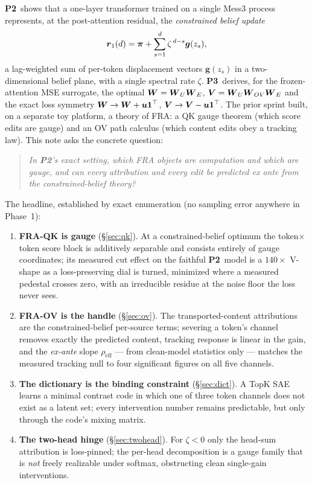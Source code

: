 \documentclass{article}
\newcommand{\gb}{\boldsymbol{g}}
\newcommand{\Ptwo}{\textbf{P2}}
\newcommand{\Pthree}{\textbf{P3}}
\begin{document}
\Ptwo\ shows that a one-layer transformer trained on a single Mess3 process
represents, at the post-attention residual, the \emph{constrained belief update}
\begin{equation}\label{eq:cbu-intro}
\rb_1(d)=\pib+\sum_{s=1}^{d}\zeta^{\,d-s}\gb(z_s),
\end{equation}
a lag-weighted sum of per-token displacement vectors $\gb(z_s)$ in a
two-dimensional belief plane, with a single spectral rate $\zeta$. \Pthree\ derives,
for the frozen-attention MSE surrogate, the optimal $\boldsymbol{W}=\boldsymbol{W}_U\boldsymbol{W}_E$,
$\boldsymbol{V}=\boldsymbol{W}_U\boldsymbol{W}_{OV}\boldsymbol{W}_E$ and the exact loss symmetry $\boldsymbol{W}\to\boldsymbol{W}+\boldsymbol{u}\boldsymbol{1}^\top$,
$\boldsymbol{V}\to\boldsymbol{V}-\boldsymbol{u}\boldsymbol{1}^\top$. The prior sprint built, on a separate toy platform, a
theory of FRA: a QK gauge theorem (which score edits are gauge) and an OV path
calculus (which content edits obey a tracking law). This note asks the concrete
question:
\begin{quote}\itshape
In \Ptwo's exact setting, which FRA objects are computation and which are gauge,
and can every attribution and every edit be predicted ex ante from the
constrained-belief theory?
\end{quote}
The headline, established by exact enumeration (no sampling error anywhere in
Phase~1):
\begin{enumerate}
\item \textbf{FRA-QK is gauge} (\S\ref{sec:qk}). At a constrained-belief optimum
the token$\times$token score block is additively separable and consists entirely
of gauge coordinates; its measured cut effect on the faithful \Ptwo\ model is a
$140\times$ V-shape as a loss-preserving dial is turned, minimized where a measured
pedestal crosses zero, with an irreducible residue at the noise floor the loss
never sees.
\item \textbf{FRA-OV is the handle} (\S\ref{sec:ov}). The transported-content
attributions are the constrained-belief per-source terms; severing a token's
channel removes exactly the predicted content, tracking response is linear in the
gain, and the \emph{ex-ante} slope $\rho_{\mathrm{eff}}$ --- from clean-model
statistics only --- matches the measured tracking null to four significant figures
on all five channels.
\item \textbf{The dictionary is the binding constraint} (\S\ref{sec:dict}). A TopK
SAE learns a minimal contrast code in which one of three token channels does not
exist as a latent set; every intervention number remains predictable, but only
through the code's mixing matrix.
\item \textbf{The two-head hinge} (\S\ref{sec:twohead}). For $\zeta<0$ only the
head-sum attribution is loss-pinned; the per-head decomposition is a gauge family
that is \emph{not} freely realizable under softmax, obstructing clean single-gain
interventions.
\end{enumerate}
\end{document}
